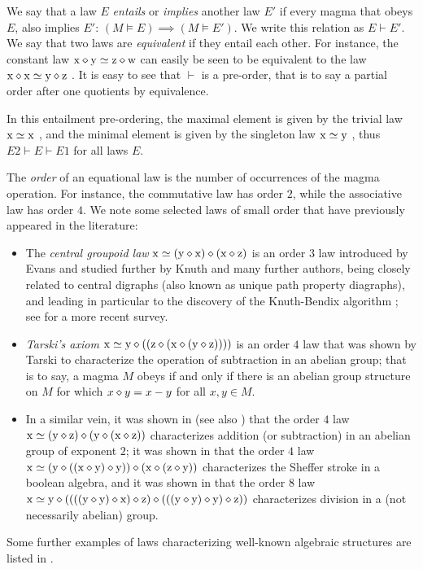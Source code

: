 We say that a law $E$ \emph{entails} or \emph{implies} another law $E'$ if every magma that obeys $E$, also implies $E'$: $(M \models E) \implies (M \models E')$.  We write this relation as $E \vdash E'$. We say that two laws are \emph{equivalent} if they entail each other. For instance, the constant law $\mathrm{x} \diamond \mathrm{y} \simeq \mathrm{z} \diamond \mathrm{w}$  can easily be seen to be equivalent to the law $\mathrm{x} \diamond \mathrm{x} \simeq \mathrm{y} \diamond \mathrm{z}$ .  It is easy to see that $\vdash$ is a pre-order, that is to say a partial order after one quotients by equivalence.

In this entailment pre-ordering, the maximal element is given by the trivial law $\mathrm{x}\simeq\mathrm{x}$ , and the minimal element is given by the singleton law $\mathrm{x}\simeq \mathrm{y}$ , thus $E2 \vdash E \vdash E1$ for all laws $E$.

The \emph{order} of an equational law is the number of occurrences of the magma operation. For instance, the commutative law  has order $2$, while the associative law  has order $4$. We note some selected laws of small order that have previously appeared in the literature:
\begin{itemize}
\item The \emph{central groupoid law} $\mathrm{x} \simeq (\mathrm{y} \diamond \mathrm{x}) \diamond (\mathrm{x} \diamond \mathrm{z})$  is an order $3$ law introduced by Evans \cite{evans} and studied further by Knuth \cite{knuth} and many further authors, being closely related to central digraphs (also known as unique path property diagraphs), and leading in particular to the discovery of the Knuth-Bendix algorithm \cite{knuth-bendix}; see \cite{klt} for a more recent survey.
\item \emph{Tarski's axiom} $\mathrm{x} \simeq \mathrm{y} \diamond ( (\mathrm{z} \diamond (\mathrm{x} \diamond (\mathrm{y} \diamond \mathrm{z}))))$  is an order $4$ law that was shown by Tarski \cite{Tarski1938} to characterize the operation of subtraction in an abelian group; that is to say, a magma $M$ obeys  if and only if there is an abelian group structure on $M$ for which $x \diamond y = x-y$ for all $x,y \in M$.
\item In a similar vein, it was shown in \cite{mendelsohn-padmanabhan} (see also \cite{meredith-prior}) that the order $4$ law
$\mathrm{x} \simeq (\mathrm{y} \diamond \mathrm{z}) \diamond (\mathrm{y} \diamond (\mathrm{x} \diamond \mathrm{z}))$  characterizes addition (or subtraction) in an abelian group of exponent $2$; it was shown in \cite{mccune_et_al} that the order $4$ law $\mathrm{x} \simeq (\mathrm{y} \diamond ((\mathrm{x} \diamond \mathrm{y}) \diamond \mathrm{y})) \diamond (\mathrm{x} \diamond (\mathrm{z} \diamond \mathrm{y}))$  characterizes the Sheffer stroke in a boolean algebra, and it was shown in \cite{higman-neumann} that the order $8$ law
$\mathrm{x} \simeq \mathrm{y} \diamond ((((\mathrm{y} \diamond \mathrm{y}) \diamond \mathrm{x}) \diamond \mathrm{z}) \diamond (((\mathrm{y} \diamond \mathrm{y}) \diamond \mathrm{y}) \diamond \mathrm{z}))$  characterizes division in a (not necessarily abelian) group.
\end{itemize}
Some further examples of laws characterizing well-known algebraic structures are listed in \cite{mccune-survey}.


